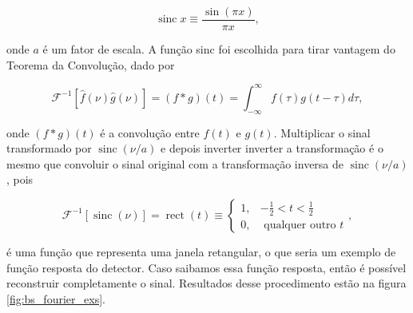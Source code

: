 \documentclass[a4paper,12pt,oneside]{book}
\DeclareMathOperator{\sinc}{sinc}
\DeclareMathOperator{\rect}{rect}
\begin{document}
\begin{equation}
    \sinc x \equiv \frac{\sin (\pi x)}{\pi x},
\end{equation}

\par onde $a$ é um fator de escala. A função sinc foi escolhida para tirar vantagem do Teorema da Convolução, dado por\cite{metodos_mat_aplicada}

\begin{equation}
    \mathscr{F}^{-1}[\hat{f}(\nu) \hat{g}(\nu)]=(f * g)(t)=\int_{-\infty}^{\infty} f(\tau) g(t-\tau) d \tau, 
\end{equation}

\par onde $(f * g)(t)$ é a convolução entre $f(t)$ e $g(t)$. Multiplicar o sinal transformado por $\sinc (\nu / a)$ e depois inverter inverter a transformação é o mesmo que convoluir o sinal original com a transformação inversa de $\sinc (\nu / a)$, pois

\begin{equation}
\mathscr{F}^{-1}[\sinc(\nu)]=\rect(t) \equiv \begin{cases}1, & -\frac{1}{2}<t<\frac{1}{2} \\ 0, & \text { qualquer outro }t\end{cases},
\end{equation}

é uma função que representa uma janela retangular, o que seria um exemplo de função resposta do detector. Caso saibamos essa função resposta, então é possível reconstruir completamente o sinal. Resultados desse procedimento estão na figura \ref{fig:bs_fourier_exs}.
\end{document}
